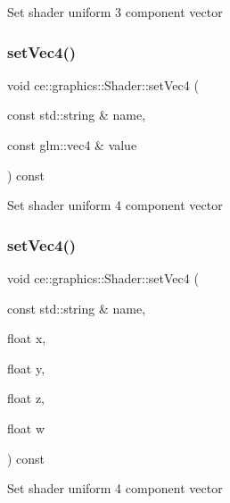 Set shader uniform 3 component vector \mbox{\label{classce_1_1graphics_1_1_shader_a77137819a5a8b7ec1313c19a0aef52b2}} 
\subsubsection{\texorpdfstring{set\+Vec4()}{setVec4()}\hspace{0.1cm}{\footnotesize\ttfamily [1/2]}}
{\footnotesize\ttfamily void ce\+::graphics\+::\+Shader\+::set\+Vec4 (\begin{DoxyParamCaption}\item[{const std\+::string \&}]{name,  }\item[{const glm\+::vec4 \&}]{value }\end{DoxyParamCaption}) const}

Set shader uniform 4 component vector \mbox{\label{classce_1_1graphics_1_1_shader_aa2ce76f7663f91497157017868d4a85e}} 
\subsubsection{\texorpdfstring{set\+Vec4()}{setVec4()}\hspace{0.1cm}{\footnotesize\ttfamily [2/2]}}
{\footnotesize\ttfamily void ce\+::graphics\+::\+Shader\+::set\+Vec4 (\begin{DoxyParamCaption}\item[{const std\+::string \&}]{name,  }\item[{float}]{x,  }\item[{float}]{y,  }\item[{float}]{z,  }\item[{float}]{w }\end{DoxyParamCaption}) const}

Set shader uniform 4 component vector \mbox{\label{classce_1_1graphics_1_1_shader_aca7fefcc416d17e11cf5af7fb36148de}} 
